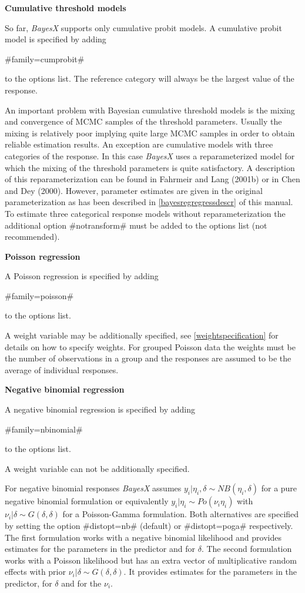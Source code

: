 {\bf Cumulative threshold models}

So far, {\em BayesX} supports only cumulative probit models. A
cumulative probit model is specified by adding

#family=cumprobit#

to the options list. The reference category will always be the
largest value of the response.

An important problem with Bayesian cumulative  threshold models is
the mixing and convergence of MCMC samples of the threshold
parameters. Usually the mixing is relatively poor implying quite
large MCMC samples in order to obtain reliable estimation results.
An exception are cumulative models with three categories of the
response. In this case {\em BayesX} uses a reparameterized model
for which the mixing of the threshold parameters is quite
satisfactory. A description of this reparameterization can be
found in Fahrmeir and Lang (2001b) or in Chen and Dey (2000).
However, parameter estimates are given in the original
parameterization as has been described in
\autoref{bayesregregressdescr} of this manual. To estimate three
categorical response models without reparameterization the
additional option #notransform# must be added to the options list
(not recommended).

{\bf Poisson regression}

A Poisson regression is specified by adding

#family=poisson#

to the options list.

A weight variable may be additionally specified, see
\autoref{weightspecification} for details on how to specify
weights. For grouped Poisson data the weights must be the number
of observations in a group and the responses are assumed to be the
average of individual responses.

{\bf Negative binomial regression}

A negative binomial regression is specified by adding

#family=nbinomial#

to the options list.

A weight variable can not be additionally specified.

For negative binomial responses {\em BayesX} assumes $y_i |
\eta_i,\delta \sim NB(\eta_i,\delta)$ for a pure negative binomial
formulation or equivalently $y_i | \eta_i \sim Po(\nu_i \eta_i)$
with $\nu_i|\delta \sim G(\delta, \delta)$ for a Poisson-Gamma
formulation. Both alternatives are specified by setting the option
#distopt=nb# (default) or #distopt=poga# respectively. The first
formulation works with a negative binomial likelihood and provides
estimates for the parameters in the predictor and for $\delta$.
The second formulation works with a Poisson likelihood but has an
extra vector of multiplicative random effects with prior
$\nu_i|\delta \sim G(\delta, \delta)$. It provides estimates for
the parameters in the predictor, for $\delta$ and for the $\nu_i$.

